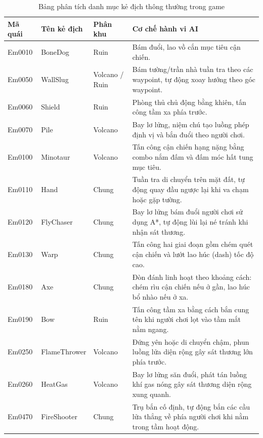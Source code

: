 \documentclass[../DoAn.tex]{subfiles}
\begin{document}
\begin{table}[H]
\centering
\begin{tabular}{|p{1.5cm}|p{3.5cm}|p{2.5cm}|p{6.5cm}|}
\hline
\textbf{Mã quái} & \textbf{Tên kẻ địch} & \textbf{Phân khu} & \textbf{Cơ chế hành vi AI} \\ \hline
Em0010 & BoneDog & Ruin & Bám đuổi, lao vồ cắn mục tiêu cận chiến. \\ \hline
Em0050 & WallSlug & Volcano / Ruin & Bám tường/trần nhà tuần tra theo các waypoint, tự động xoay hướng theo góc waypoint. \\ \hline
Em0060 & Shield & Ruin & Phòng thủ chủ động bằng khiên, tấn công tầm xa phía trước. \\ \hline
Em0070 & Pile & Volcano & Bay lơ lửng, niệm chú tạo luồng phép định vị và bắn đuổi theo người chơi. \\ \hline
Em0100 & Minotaur & Volcano & Tấn công cận chiến hạng nặng bằng combo nắm đấm và đấm móc hất tung mục tiêu. \\ \hline
Em0110 & Hand & Chung & Tuần tra di chuyển trên mặt đất, tự động quay đầu ngược lại khi va chạm hoặc gặp tường. \\ \hline
Em0120 & FlyChaser & Chung & Bay lơ lửng bám đuổi người chơi sử dụng A*, tự động lùi lại né tránh khi nhận sát thương. \\ \hline
Em0130 & Warp & Chung & Tấn công hai giai đoạn gồm chém quét cận chiến và lướt lao húc (dash) tốc độ cao. \\ \hline
Em0180 & Axe & Chung & Đòn đánh linh hoạt theo khoảng cách: chém rìu cận chiến nếu ở gần, lao húc bổ nhào nếu ở xa. \\ \hline
Em0190 & Bow & Ruin & Tấn công tầm xa bằng cách bắn cung tên khi người chơi lọt vào tầm mắt nằm ngang. \\ \hline
Em0250 & FlameThrower & Volcano & Đứng yên hoặc di chuyển chậm, phun luồng lửa diện rộng gây sát thương lớn phía trước. \\ \hline
Em0260 & HeatGas & Volcano & Bay lơ lửng săn đuổi, phát tán luồng khí gas nóng gây sát thương diện rộng xung quanh. \\ \hline
Em0470 & FireShooter & Chung & Trụ bắn cố định, tự động bắn các cầu lửa thẳng về phía người chơi khi nằm trong tầm hoạt động. \\ \hline
\end{tabular}
\caption{Bảng phân tích danh mục kẻ địch thông thường trong game}
\label{table:normal_enemies}
\end{table}
\end{document}

